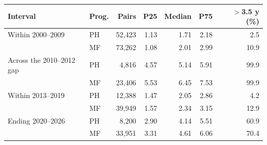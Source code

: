 \begin{tabular}{llrrrrr}
\toprule
Interval & Prog. & Pairs & P25 & Median & P75 & $>$3.5 y (\%) \\
\midrule
Within 2000--2009 & PH & 52,423 & 1.13 & 1.71 & 2.18 & 2.5 \\
 & MF & 73,262 & 1.08 & 2.01 & 2.99 & 10.9 \\
Across the 2010--2012 gap & PH & 4,816 & 4.57 & 5.14 & 5.91 & 99.9 \\
 & MF & 23,406 & 5.53 & 6.45 & 7.53 & 99.9 \\
Within 2013--2019 & PH & 12,388 & 1.47 & 2.05 & 2.86 & 4.2 \\
 & MF & 39,949 & 1.57 & 2.34 & 3.15 & 12.9 \\
Ending 2020--2026 & PH & 8,200 & 2.90 & 4.14 & 5.51 & 60.9 \\
 & MF & 33,951 & 3.31 & 4.61 & 6.06 & 70.4 \\
\bottomrule
\end{tabular}
